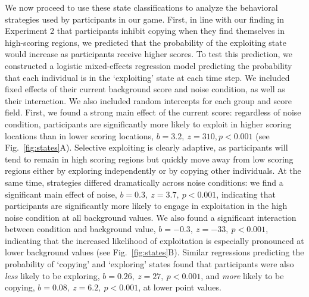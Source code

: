 \documentclass[12pt,letterpaper]{article}
\begin{document}
We now proceed to use these state classifications to analyze the behavioral strategies used by participants in our game.
First, in line with our finding in Experiment 2 that participants inhibit copying when they find themselves in high-scoring regions, we predicted that the probability of the exploiting state would increase as participants receive higher scores.  
To test this prediction, we constructed a logistic mixed-effects regression model predicting the probability that each individual is in the `exploiting' state at each time step. 
We included fixed effects of their current background score and noise condition, as well as their interaction.
We also included random intercepts for each group and score field.
First, we found a strong main effect of the current score: regardless of noise condition, participants are significantly more likely to exploit in higher scoring locations than in lower scoring locations, $b=3.2,~z=310,p<0.001$  (see Fig.~\ref{fig:states}A).
Selective exploiting is clearly adaptive, as participants will tend to remain in high scoring regions but quickly move away from low scoring regions either by exploring independently or by copying other individuals.
At the same time, strategies differed dramatically across noise conditions: we find a significant main effect of noise, $b=0.3,~z=3.7,~p<0.001$, indicating that participants are significantly more likely to engage in exploitation in the high noise condition at all background values.
We also found a significant interaction between condition and background value, $b=-0.3,~z=-33,~p<0.001$, indicating that the increased likelihood of exploitation is especially pronounced at lower background values (see Fig.~\ref{fig:states}B).
Similar regressions predicting the probability of `copying' and `exploring' states found that participants were also \emph{less} likely to be exploring, $b=0.26,~z=27,~p<0.001$, and \emph{more} likely to be copying, $b=0.08,~z=6.2,~p<0.001$, at lower point values.
\end{document}
